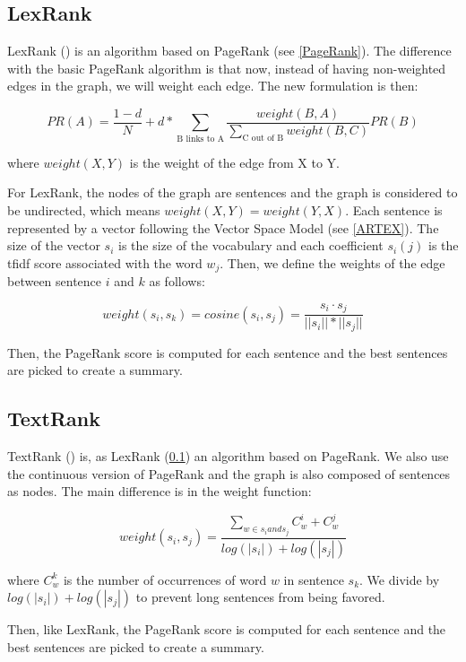 \documentclass[11pt,a4paper,oldfontcommands]{memoir}
\begin{document}
\subsection{LexRank}
\label{LexRank}

LexRank (\cite{DBLP:journals/corr/abs-1109-2128}) is an algorithm based on PageRank (see \ref{PageRank}). The difference with the basic PageRank algorithm is that now, instead of having non-weighted edges in the graph, we will weight each edge. The new formulation is then:

\[PR(A) = \frac{1 - d}{N} + d * \sum_{\text{B links to A}}\frac{weight(B, A)}{\sum_{\text{C out of B}}weight(B, C)}PR(B)\]

where $weight(X, Y)$ is the weight of the edge from X to Y.

For LexRank, the nodes of the graph are sentences and the graph is considered to be undirected, which means $weight(X, Y) = weight(Y, X)$. Each sentence is represented by a vector following the Vector Space Model (see \ref{ARTEX}). The size of the vector $s_i$ is the size of the vocabulary and each coefficient $s_i(j)$ is the tfidf score associated with the word $w_j$. Then, we define the weights of the edge between sentence $i$ and $k$ as follows:

\[weight(s_i, s_k)=cosine(s_i, s_j)= \frac{s_i \cdot s_j}{||s_i|| * ||s_j||}\]

Then, the PageRank score is computed for each sentence and the best sentences are picked to create a summary.

\subsection{TextRank}
\label{TextRank}

TextRank (\cite{DBLP:conf/emnlp/MihalceaT04}) is, as LexRank (\ref{LexRank}) an algorithm based on PageRank. We also use the continuous version of PageRank and the graph is also composed of sentences as nodes. The main difference is in the weight function:

\[weight(s_i, s_j) = \frac{\sum_{w \in s_i and s_j}C_w^i + C_w^j}{log(|s_i|) + log(|s_j|)}\]

where $C_w^k$ is the number of occurrences of word $w$ in sentence $s_k$. We divide by $log(|s_i|) + log(|s_j|)$ to prevent long sentences from being favored.

Then, like LexRank, the PageRank score is computed for each sentence and the best sentences are picked to create a summary.
\end{document}
